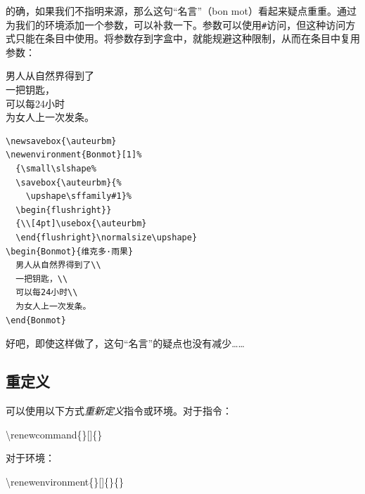 的确，如果我们不指明来源，那么这句“名言”（bon mot）看起来疑点重重。通过为我们的环境添加一个参数，可以补救一下。参数可以使用\verb|#|访问，但这种访问方式只能在条目中使用。将参数存到字盒中，就能规避这种限制，从而在条目中复用参数：

\begin{codelist}[4.24]{
  \newsavebox{\auteurbm}
\newenvironment{Bonmot}[1]%
  {\small\slshape%
  \savebox{\auteurbm}{%
    \upshape\sffamily#1}%
  \begin{flushright}}
  {\\[4pt]\usebox{\auteurbm}
  \end{flushright}\normalsize\upshape}
\begin{Bonmot}{维克多·雨果}
  男人从自然界得到了\\
  一把钥匙，\\
  可以每24小时\\
  为女人上一次发条。
\end{Bonmot}
}\begin{verbatim}
\newsavebox{\auteurbm}
\newenvironment{Bonmot}[1]%
  {\small\slshape%
  \savebox{\auteurbm}{%
    \upshape\sffamily#1}%
  \begin{flushright}}
  {\\[4pt]\usebox{\auteurbm}
  \end{flushright}\normalsize\upshape}
\begin{Bonmot}{维克多·雨果}
  男人从自然界得到了\\
  一把钥匙，\\
  可以每24小时\\
  为女人上一次发条。
\end{Bonmot}
\end{verbatim}
\end{codelist}

好吧，即使这样做了，这句“名言”的疑点也没有减少……

\subsection{重定义}

可以使用以下方式\emph{重新定义}指令或环境。对于指令：

\begin{dmd}
\backslash renewcommand\{\}[]\{\}
\end{dmd}

对于环境：

\begin{dmd}
\backslash renewenvironment\{\}[]\{\}\{\}
\end{dmd}

